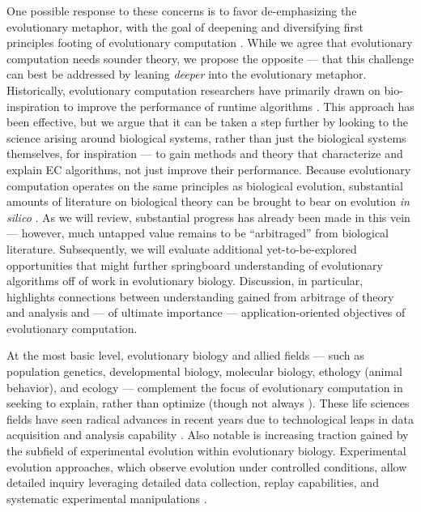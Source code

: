 One possible response to these concerns is to favor de-emphasizing the evolutionary metaphor, with the goal of deepening and diversifying first principles footing of evolutionary computation \citep{moore2023evolution}.
While we agree that evolutionary computation needs sounder theory, we propose the opposite --- that this challenge can best be addressed by leaning \textit{deeper} into the evolutionary metaphor.
Historically, evolutionary computation researchers have primarily drawn on bio-inspiration to improve the performance of runtime algorithms \citep{banzhaf2006artificial,kumar2003biologically,mcphee2009developmental}.
This approach has been effective, but we argue that it can be taken a step further by looking to the science arising around biological systems, rather than just the biological systems themselves, for inspiration --- to gain methods and theory that characterize and explain EC algorithms, not just improve their performance.
Because evolutionary computation operates on the same principles as biological evolution, substantial amounts of literature on biological theory can be brought to bear on evolution \textit{in silico} \citep{belew1996computation}.
As we will review, substantial progress has already been made in this vein --- however, much untapped value remains to be ``arbitraged'' from biological literature.
Subsequently, we will evaluate additional yet-to-be-explored opportunities that might further springboard understanding of evolutionary algorithms off of work in evolutionary biology.
Discussion, in particular, highlights connections between understanding gained from arbitrage of theory and analysis and --- of ultimate importance --- application-oriented objectives of evolutionary computation.

At the most basic level, evolutionary biology and allied fields --- such as population genetics, developmental biology, molecular biology, ethology (animal behavior), and ecology --- complement the focus of evolutionary computation in seeking to explain, rather than optimize (though not always \citep{cobb2013directed,carroll2014applying}).
These life sciences fields have seen radical advances in recent years due to technological leaps in data acquisition and analysis capability \citep{math2018omics,deshpande2024evolution}.
Also notable is increasing traction gained by the subfield of experimental evolution within evolutionary biology.
Experimental evolution approaches, which observe evolution under controlled conditions, allow detailed inquiry leveraging detailed data collection, replay capabilities, and systematic experimental manipulations \citep{kawecki2012experimental}.

